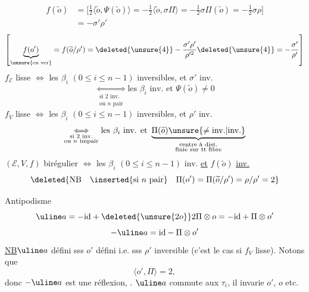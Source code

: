 \[
\begin{aligned}
f(\widetilde o)
&=\bigl[\tfrac12\langle\widetilde o,\Psi(\widetilde o)\rangle
=-\tfrac12\langle\widetilde o,\sigma\Pi\rangle
=-\tfrac12\sigma\Pi(\widetilde o)
=-\tfrac12\sigma\rho\bigr]\\
&=-\sigma'\rho'
\end{aligned}
\]
\[
\left[
\underbrace{f(o')}_{\unsure{\text{en ver}}}
=f(\widetilde o/\rho')
=\deleted{\unsure{4}}-\frac{\sigma'\rho'}{\rho'^2}
\deleted{\unsure{4}}
=-\frac{\sigma'}{\rho'}
\right]
\]
$f_{\mathcal E}$ lisse
$\Longleftrightarrow$ les $\beta_i$ $(0\leq i\leq n-1)$ inversibles,
et $\sigma'$ inv.
\[
\underset{\substack{\text{si }2\text{ inv.}\\\text{ou }n\text{ pair}}}{\Longleftrightarrow}
\text{les }\beta_i\text{ inv. et }\Psi(\widetilde o)\neq0
\]
$f_V$ lisse
$\Longleftrightarrow$ les $\beta_i$ $(0\leq i\leq n-1)$ inversibles,
et $\rho'$ inv.
\[
\underset{\substack{\text{si }2\text{ inv.}\\\text{ou }n\text{ impair}}}{\Longleftrightarrow}
\text{les }\beta_i\text{ inv. et }
\underbrace{\Pi(\widetilde o)\unsure{\neq\text{inv.}|\text{inv.}}}_{
\substack{\text{centre à dist.}\\\text{finie sur tt fibre}}}
\]
$(\mathcal E,V,f)$ birégulier
$\Longleftrightarrow$ les $\beta_i$ $(0\leq i\leq n-1)$ inv.
\uline{et} $f(\widetilde o)$ \uline{inv.}
\[
\deleted{\text{NB}\quad\inserted{\text{si }n\text{ pair}}\quad
\Pi(o')=\Pi(\widetilde o/\rho')=\rho/\rho'=2}
\]

Antipodisme
\[
\uline a=-\mathrm{id}+\deleted{\unsure{2o}}
2\Pi\otimes o=-\mathrm{id}+\Pi\otimes o'
\]
\[
-\uline a=\mathrm{id}-\Pi\otimes o'
\]
\uline{NB}\quad$\uline a$ défini sss $o'$ défini i.e. sss $\rho'$ inversible
(c'est le cas si $f_V$ lisse). Notons que
\[
\langle o',\Pi\rangle=2,
\]
donc $-\uline a$ est une réflexion,
.
$\uline a$ commute aux $\tau_i$, il invarie $o'$, $o$ etc.

